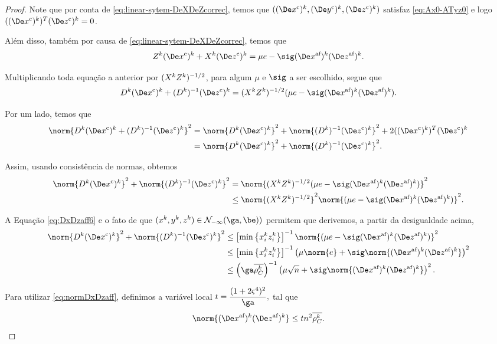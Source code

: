 \begin{proof}
	Note que por conta de \eqref{eq:linear-sytem-DeXDeZcorrec}, temos que $(\Dekcox,\Dekcoy,\Dekcoz)$ satisfaz \eqref{eq:Ax0-ATyz0} e logo $(\Dekcox)^{T}\Dekcoz = 0 $. 

	


	Além disso, também por causa de \eqref{eq:linear-sytem-DeXDeZcorrec}, temos que
	\[
	\Zk\Dekcox + \Xk\Dekcoz = \mu e  - \sig \dekx  \dekz .
	\]

	Multiplicando toda equação  a anterior por $(  X^{k} Z^{k}  )^{-1/2}$,  para algum $\mu$ e $\sig$ a ser escolhido, segue que 
	\[
		\Dk\Dekcox + \Dik\Dekcoz = (  \Xk \Zk  )^{-1/2}(\mu e - \sig \dekx  \dekz ).
	\] 

	Por um lado, temos que 
	\[
		\begin{aligned}
		\norm{\Dk\Dekcox + \Dik\Dekcoz}^{2} & = \norm{\Dk\Dekcox}^{2} + \norm{\Dik\Dekcoz}^{2} + 2(\Dekcox)^{T}\Dekcoz  \\ &= \norm{\Dk\Dekcox}^{2} + \norm{\Dik\Dekcoz}^{2}.
		\end{aligned}
	\]

Assim, usando consistência de normas, obtemos
\begin{align*}
	\norm{\Dk\Dekcox}^{2} + \norm{\Dik\Dekcoz}^{2} & = \norm{(  \Xk \Zk  )^{-1/2}(\mu e- \sig \dekx  \dekz )}^{2} \notag\\ 
												& \leq \norm{(  \Xk \Zk  )^{-1/2}}^{2}\norm{(\mu e-  \sig \dekx  \dekz )}^{2} .	
\end{align*}


 A Equação \eqref{eq:DxDzaff6} e o fato de que  $(\xk,\yk,\zk)\in\Nset_{-\infty}(\ga,\be))$ permitem que derivemos, a partir da desigualdade acima, 
\begin{align}
	\norm{\Dk\Dekcox}^{2} + \norm{\Dik\Dekcoz}^{2} 	& \leq \left[\min\left\{\xk_i\zk_i\right\}\right]^{-1}\norm{(\mu e-  \sig \dekx  \dekz )}^{2}\notag\\
	& \leq \left[\min\left\{\xk_i\zk_i\right\}\right]^{-1}\left(\mu\norm{ e} +{\sig}\norm{ \dekx  \dekz }\right)^{2}\notag\\
												& \leq \left(\ga\rhoCkb \right)^{-1}\left(\mu\sqrt{n} +{\sig}\norm{ \dekx  \dekz }\right)^{2}. \label{eq:DxDzc1}		
\end{align}

Para utilizar \eqref{eq:normDxDzaff}, definimos a variável local
$
t = \dfrac{(1 + 2\bdxzstar^{4})^{2} }{\ga},
$
tal que 
\[
\norm{ \dekx  \dekz  } \leq t n^{2}\rhoCkb.
\]


\end{proof}
